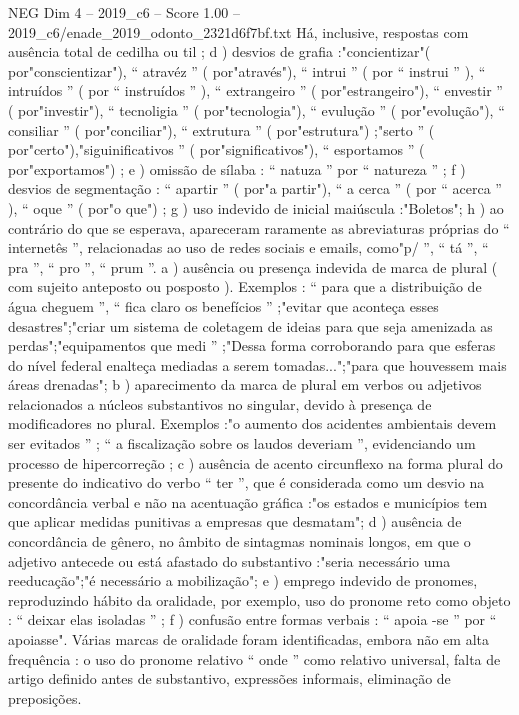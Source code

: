 \begin{textsample}{NEG Dim 4 – 2019\_c6 – Score 1.00 – 2019\_c6/enade\_2019\_odonto\_2321d6f7bf.txt}
Há, inclusive, respostas com ausência total de cedilha ou til ; d ) desvios de grafia :"concientizar"( por"conscientizar"), “ atravéz ” ( por"através"), “ intrui ” ( por “ instrui ” ), “ intruídos ” ( por “ instruídos ” ), “ extrangeiro ” ( por"estrangeiro"), “ envestir ” ( por"investir"), “ tecnoligia ” ( por"tecnologia"), “ evulução ” ( por"evolução"), “ consiliar ” ( por"conciliar"), “ extrutura ” ( por"estrutura") ;"serto ” ( por"certo"),"siguinificativos ” ( por"significativos"), “ esportamos ” ( por"exportamos") ; e ) omissão de sílaba : “ natuza ” por “ natureza ” ; f ) desvios de segmentação : “ apartir ” ( por"a partir"), “ a cerca ” ( por “ acerca ” ), “ oque ” ( por"o que") ; g ) uso indevido de inicial maiúscula :"Boletos"; h ) ao contrário do que se esperava, apareceram raramente as abreviaturas próprias do “ internetês ”, relacionadas ao uso de redes sociais e emails, como"p/ ”, “ tá ”, “ pra ”, “ pro ”, “ prum ”. a ) ausência ou presença indevida de marca de plural ( com sujeito anteposto ou posposto ).
Exemplos : “ para que a distribuição de água cheguem ”, “ fica claro os benefícios ” ;"evitar que aconteça esses desastres";"criar um sistema de coletagem de ideias para que seja amenizada as perdas";"equipamentos que medi ” ;"Dessa forma corroborando para que esferas do nível federal enalteça mediadas a serem tomadas...";"para que houvessem mais áreas drenadas"; b ) aparecimento da marca de plural em verbos ou adjetivos relacionados a núcleos substantivos no singular, devido à presença de modificadores no plural.
Exemplos :"o aumento dos acidentes ambientais devem ser evitados ” ; “ a fiscalização sobre os laudos deveriam ”, evidenciando um processo de hipercorreção ; c ) ausência de acento circunflexo na forma plural do presente do indicativo do verbo “ ter ”, que é considerada como um desvio na concordância verbal e não na acentuação gráfica :"os estados e municípios tem que aplicar medidas punitivas a empresas que desmatam"; d ) ausência de concordância de gênero, no âmbito de sintagmas nominais longos, em que o adjetivo antecede ou está afastado do substantivo :"seria necessário uma reeducação";"é necessário a mobilização"; e ) emprego indevido de pronomes, reproduzindo hábito da oralidade, por exemplo, uso do pronome reto como objeto : “ deixar elas isoladas ” ; f ) confusão entre formas verbais : “ apoia -se ” por “ apoiasse".
Várias marcas de oralidade foram identificadas, embora não em alta frequência : o uso do pronome relativo “ onde ” como relativo universal, falta de artigo definido antes de substantivo, expressões informais, eliminação de preposições.

\end{textsample}
